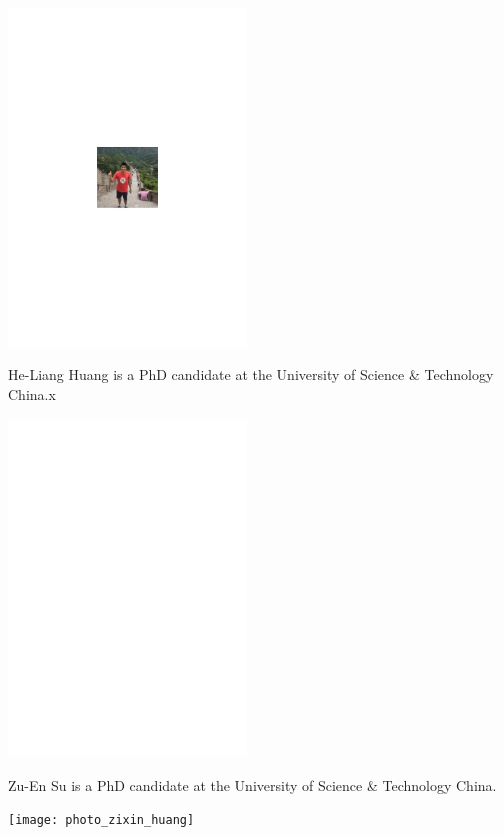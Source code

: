 \begin{center}
\includegraphics[width=0.475\textwidth]{photo_heliang_huang}
\end{center}

He-Liang Huang is a PhD candidate at the University of Science \& Technology China.x

%
%

\begin{center}
\includegraphics[width=0.475\textwidth]{photo_zuen_su}
\end{center}

Zu-En Su is a PhD candidate at the University of Science \& Technology China.


%
%

\begin{center}
\texttt{[image: photo\_zixin\_huang]}
\end{center}

